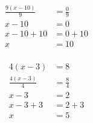 \documentclass[12pt]{article}
\newcounter{minipagecount}
\begin{document}
\begin{multicols}{2}
\begin{minipage}[t]{0.45\textwidth}
\begin{align*}
        \frac{9(x-10)}{9} &= \frac{0}{9}\\
        x - 10 &= 0\\
        x - 10 + 10 &= 0 + 10\\
        x &= 10\\
    \end{align*}
\end{minipage} %
\noindent{(\theminipagecount)}\hspace{0.1mm} %
\begin{minipage}[t]{0.45\textwidth} %
    \vspace{-26pt}  %
    \raggedright %
    \begin{align*} %
        4(x - 3) &= 8\\
        \frac{4(x-3)}{4} &= \frac{8}{4}\\
        x - 3 &= 2\\
        x - 3 + 3 &= 2 + 3\\
        x &= 5\\
    \end{align*}
\end{minipage}\columnbreak
\noindent{(\theminipagecount)}\hspace{0.1mm} %
\begin{minipage}[t]{0.45\textwidth} %
    \vspace{-26pt}  %
    \raggedright %
    \begin{align*} %

\end{align*}
\end{minipage}
\end{multicols}
\end{document}
